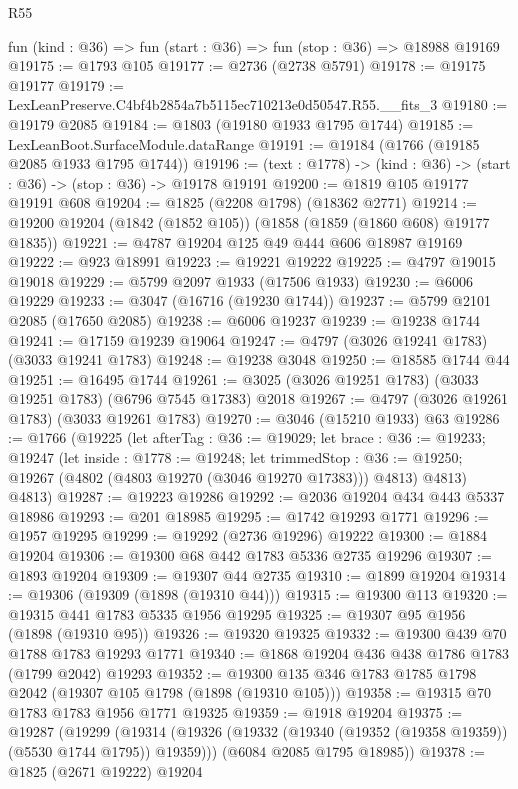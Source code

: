 \begin{lexlean}{R55}
\begin{coremodule}
  fun (kind : @36) => fun (start : @36) => fun (stop : @36) => @18988 @19169
@19175 := @1793 @105
@19177 := @2736 (@2738 @5791)
@19178 := @19175 @19177
@19179 := LexLeanPreserve.C4bf4b2854a7b5115ec710213e0d50547.R55.__fits_3
@19180 := @19179 @2085
@19184 := @1803 (@19180 @1933 @1795 @1744)
@19185 := LexLeanBoot.SurfaceModule.dataRange
@19191 := @19184 (@1766 (@19185 @2085 @1933 @1795 @1744))
@19196 := (text : @1778) -> (kind : @36) -> (start : @36) -> (stop : @36) -> @19178 @19191
@19200 := @1819 @105 @19177 @19191 @608
@19204 := @1825 (@2208 @1798) (@18362 @2771)
@19214 := @19200 @19204 (@1842 (@1852 @105)) (@1858 (@1859 (@1860 @608) @19177 @1835))
@19221 := @4787 @19204 @125 @49 @444 @606 @18987 @19169
@19222 := @923 @18991
@19223 := @19221 @19222
@19225 := @4797 @19015 @19018
@19229 := @5799 @2097 @1933 (@17506 @1933)
@19230 := @6006 @19229
@19233 := @3047 (@16716 (@19230 @1744))
@19237 := @5799 @2101 @2085 (@17650 @2085)
@19238 := @6006 @19237
@19239 := @19238 @1744
@19241 := @17159 @19239 @19064
@19247 := @4797 (@3026 @19241 @1783) (@3033 @19241 @1783)
@19248 := @19238 @3048
@19250 := @18585 @1744 @44
@19251 := @16495 @1744
@19261 := @3025 (@3026 @19251 @1783) (@3033 @19251 @1783) (@6796 @7545 @17383) @2018
@19267 := @4797 (@3026 @19261 @1783) (@3033 @19261 @1783)
@19270 := @3046 (@15210 @1933) @63
@19286 := @1766
    (@19225
      (let afterTag : @36 := @19029;
      let brace : @36 := @19233;
      @19247
        (let inside : @1778 := @19248;
        let trimmedStop : @36 := @19250; @19267 (@4802 (@4803 @19270 (@3046 @19270 @17383))) @4813)
        @4813)
      @4813)
@19287 := @19223 @19286
@19292 := @2036 @19204 @434 @443 @5337 @18986
@19293 := @201 @18985
@19295 := @1742 @19293 @1771
@19296 := @1957 @19295
@19299 := @19292 (@2736 @19296) @19222
@19300 := @1884 @19204
@19306 := @19300 @68 @442 @1783 @5336 @2735 @19296
@19307 := @1893 @19204
@19309 := @19307 @44 @2735
@19310 := @1899 @19204
@19314 := @19306 (@19309 (@1898 (@19310 @44)))
@19315 := @19300 @113
@19320 := @19315 @441 @1783 @5335 @1956 @19295
@19325 := @19307 @95 @1956 (@1898 (@19310 @95))
@19326 := @19320 @19325
@19332 := @19300 @439 @70 @1788 @1783 @19293 @1771
@19340 := @1868 @19204 @436 @438 @1786 @1783 (@1799 @2042) @19293
@19352 := @19300 @135 @346 @1783 @1785 @1798 @2042 (@19307 @105 @1798 (@1898 (@19310 @105)))
@19358 := @19315 @70 @1783 @1783 @1956 @1771 @19325
@19359 := @1918 @19204
@19375 := @19287
    (@19299
      (@19314 (@19326 (@19332 (@19340 (@19352 (@19358 @19359)) (@5530 @1744 @1795)) @19359)))
      (@6084 @2085 @1795 @18985))
@19378 := @1825 (@2671 @19222) @19204

\end{coremodule}
\end{lexlean}

